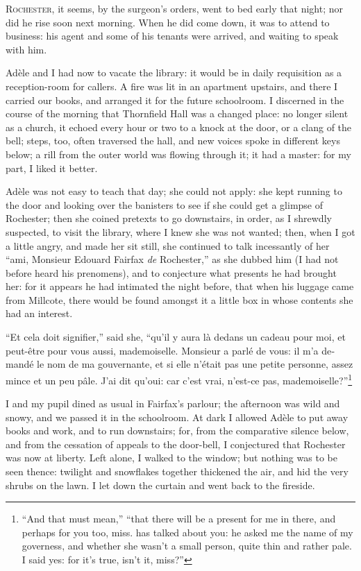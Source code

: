 
 \textsc{ Rochester,} it seems, by the surgeon's orders, went to bed early that
night; nor did he rise soon next morning. When he did come down, it was
to attend to business: his agent and some of his tenants were arrived,
and waiting to speak with him.

Adèle and I had now to vacate the library: it would be in daily
requisition as a reception-room for callers. A fire was lit in an
apartment upstairs, and there I carried our books, and arranged it for
the future schoolroom. I discerned in the course of the morning that
Thornfield Hall was a changed place: no longer silent as a church, it
echoed every hour or two to a knock at the door, or a clang of the bell;
steps, too, often traversed the hall, and new voices spoke in different
keys below; a rill from the outer world was flowing through it; it had a
master: for my part, I liked it better.

Adèle was not easy to teach that day; she could not apply: she kept
running to the door and looking over the banisters to see if she could
get a glimpse of \Mr{} Rochester; then she coined pretexts to go
downstairs, in order, as I shrewdly suspected, to visit the library,
where I knew she was not wanted; then, when I got a little angry, and
made her sit still, she continued to talk incessantly of her \foreignquote{french}{ami,
Monsieur Edouard Fairfax \emph{de} Rochester,} as she dubbed him (I had
not before heard his prenomens), and to conjecture what presents he had
brought her: for it appears he had intimated the night before, that when
his luggage came from Millcote, there would be found amongst it a little
box in whose contents she had an interest.

\foreignquote{french}{Et cela doit signifier,} said she, \foreignquote{french}{qu'il y aura là
dedans un cadeau pour moi, et peut-être pour vous aussi, mademoiselle. 
Monsieur a parlé de vous: il m'a demandé le nom de ma gouvernante, et si
elle n'était pas une petite personne, assez mince et un peu pâle. J'ai
dit qu'oui: car c'est vrai, n'est-ce pas, mademoiselle?}\footnote{%
\enquote{And that must mean,} \textelp{} \enquote{that there will be a present
for me in there, and perhaps for you too, miss. \Mr{} has talked about you:
he asked me the name of my governess, and whether she wasn't a small
person, quite thin and rather pale. I said yes: for it's true, isn't it, miss?}}

I and my pupil dined as usual in \Mrs{} Fairfax's parlour; the afternoon
was wild and snowy, and we passed it in the schoolroom. At dark I
allowed Adèle to put away books and work, and to run downstairs; for,
from the comparative silence below, and from the cessation of appeals to
the door-bell, I conjectured that \Mr{} Rochester was now at liberty. 
Left alone, I walked to the window; but nothing was to be seen thence:
twilight and snowflakes together thickened the air, and hid the very
shrubs on the lawn. I let down the curtain and went back to the
fireside.

